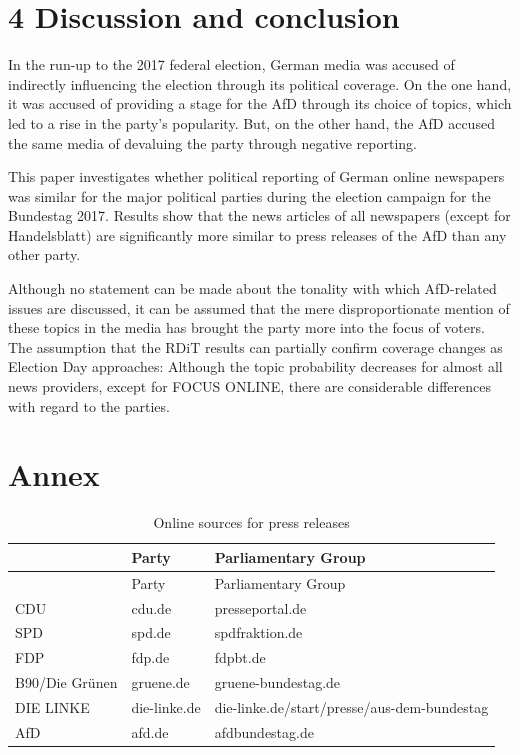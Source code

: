 \documentclass[
  12pt,
]{article}
\begin{document}
\pagebreak

\hypertarget{discussion-and-conclusion}{%
\section{4 Discussion and conclusion}\label{discussion-and-conclusion}}

In the run-up to the 2017 federal election, German media was accused of
indirectly influencing the election through its political coverage. On
the one hand, it was accused of providing a stage for the AfD through
its choice of topics, which led to a rise in the party's popularity.
But, on the other hand, the AfD accused the same media of devaluing the
party through negative reporting.

This paper investigates whether political reporting of German online
newspapers was similar for the major political parties during the
election campaign for the Bundestag 2017. Results show that the news
articles of all newspapers (except for Handelsblatt) are significantly
more similar to press releases of the AfD than any other party.

Although no statement can be made about the tonality with which
AfD-related issues are discussed, it can be assumed that the mere
disproportionate mention of these topics in the media has brought the
party more into the focus of voters. The assumption that the RDiT
results can partially confirm coverage changes as Election Day
approaches: Although the topic probability decreases for almost all news
providers, except for FOCUS ONLINE, there are considerable differences
with regard to the parties.

\newpage

\hypertarget{annex}{%
\section{Annex}\label{annex}}

\begin{longtable}[]{@{}lll@{}}
\caption{Online sources for press releases
\label{table:press_releases_sources}}\tabularnewline
\toprule
& Party & Parliamentary Group \\
\midrule
\endfirsthead
\toprule
& Party & Parliamentary Group \\
\midrule
\endhead
CDU & cdu.de & presseportal.de \\
SPD & spd.de & spdfraktion.de \\
FDP & fdp.de & fdpbt.de \\
B90/Die Grünen & gruene.de & gruene-bundestag.de \\
DIE LINKE & die-linke.de &
die-linke.de/start/presse/aus-dem-bundestag \\
AfD & afd.de & afdbundestag.de \\
\bottomrule
\end{longtable}
\end{document}
